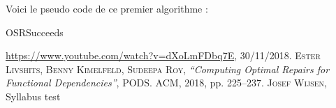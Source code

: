 \documentclass[12pt, a4paper, oneside, titlepage]{book}%
\makeatletter
\def\BState{\State\hskip-\ALG@thistlm}
\makeatother
\begin{document}
Voici le pseudo code de ce premier algorithme : 


\begin{algorithm}
\caption{OSRSucceeds}\label{euclid}
\end{algorithm}

















\clearpage
\appendix

\begin{thebibliography}{9}
 \url{https://www.youtube.com/watch?v=dXoLmFDbq7E}, 30/11/2018.
 \textsc{Ester Livshits, Benny Kimelfeld, Sudeepa Roy}, \textit{ “Computing Optimal Repairs for Functional Dependencies”}, PODS. ACM, 2018, pp. 225–237.
 \textsc{Josef Wijsen}, {Syllabus}
 test
\end{thebibliography}

\end{document}
